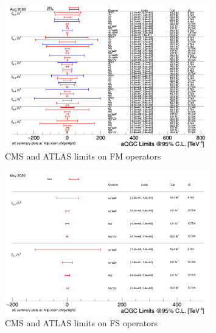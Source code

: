 \begin{figure}[tbp]
\begin{center}
 \includegraphics[width=0.80\textwidth,keepaspectratio]{figures/aQGC/aQGC_fm.png}
\caption{CMS and ATLAS limits on FM operators}
\label{fig:limitFM}
\end{center}
\end{figure}

\begin{figure}[tbp]
\begin{center}
 \includegraphics[width=0.80\textwidth,keepaspectratio]{figures/aQGC/aQGC_fs.png}
\caption{CMS and ATLAS limits on FS operators}
\label{fig:limitFS}
\end{center}
\end{figure}


